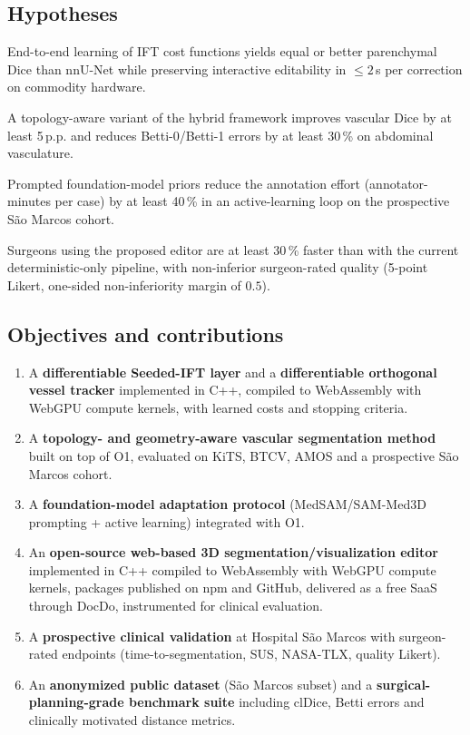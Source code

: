 \documentclass[a4paper,11pt,twoside]{article}
\begin{document}
\subsection{Hypotheses}

\begin{description}[leftmargin=1.6em]
  \item[H1] End-to-end learning of IFT cost functions yields equal or better
       parenchymal Dice than nnU-Net while preserving interactive editability
       in $\le 2$\,s per correction on commodity hardware.
  \item[H2] A topology-aware variant of the hybrid framework improves
       vascular Dice by at least 5\,p.p. and reduces Betti-0/Betti-1 errors
       by at least 30\,\% on abdominal vasculature.
  \item[H3] Prompted foundation-model priors reduce the annotation effort
       (annotator-minutes per case) by at least 40\,\% in an active-learning
       loop on the prospective S\~ao Marcos cohort.
  \item[H4] Surgeons using the proposed editor are at least 30\,\% faster
       than with the current deterministic-only pipeline, with non-inferior
       surgeon-rated quality (5-point Likert, one-sided non-inferiority
       margin of $0.5$).
\end{description}

\subsection{Objectives and contributions}

\begin{enumerate}
  \item[O1] A \textbf{differentiable Seeded-IFT layer} and a
        \textbf{differentiable orthogonal vessel tracker} implemented in C++,
        compiled to WebAssembly with WebGPU compute kernels, with
        learned costs and stopping criteria.
  \item[O2] A \textbf{topology- and geometry-aware vascular segmentation
        method} built on top of O1, evaluated on KiTS, BTCV, AMOS and a
        prospective S\~ao Marcos cohort.
  \item[O3] A \textbf{foundation-model adaptation protocol}
        (MedSAM/SAM-Med3D prompting + active learning) integrated with O1.
  \item[O4] An \textbf{open-source web-based 3D segmentation/visualization
        editor} implemented in C++ compiled to WebAssembly with WebGPU
        compute kernels, packages published on npm and GitHub, delivered as
        a free SaaS through DocDo, instrumented for clinical evaluation.
  \item[O5] A \textbf{prospective clinical validation} at Hospital S\~ao
        Marcos with surgeon-rated endpoints (time-to-segmentation, SUS,
        NASA-TLX, quality Likert).
  \item[O6] An \textbf{anonymized public dataset} (S\~ao Marcos subset) and
        a \textbf{surgical-planning-grade benchmark suite} including clDice,
        Betti errors and clinically motivated distance metrics.
\end{enumerate}
\end{document}

